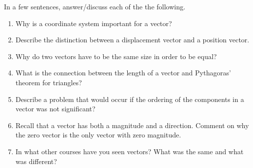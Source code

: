 \begin{exercise} \label{ex:} 
In a few sentences, answer\slash discuss each of the the following.
\begin{enumerate}
\item Why is a coordinate system important for a vector?

\item Describe the distinction between a displacement vector and a position vector.

\item Why do two vectors have to be the same size in order to be equal?

\item What is the connection between the length of a vector and Pythagoras' theorem for triangles?

\item Describe a problem that would occur if the ordering of the components in a vector was not significant?

\item Recall that a vector has both a magnitude and a direction.  
Comment on why the zero vector is the only vector with zero magnitude.

\item In what other courses have you seen vectors?  What was the same and what was different?

\end{enumerate}
\end{exercise}

